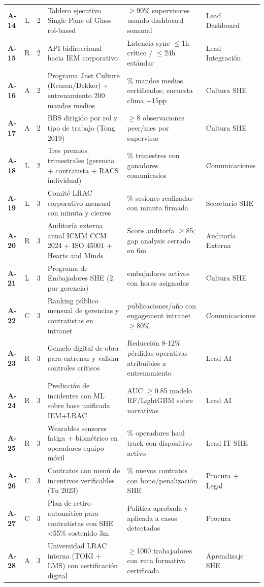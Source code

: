 \begin{longtable}{@{}>{\bfseries}p{0.55cm} c c >{\raggedright\arraybackslash}p{5.6cm} >{\raggedright\arraybackslash}p{4.8cm} >{\raggedright\arraybackslash}p{2.6cm}@{}}
A-14 & L & 2 & Tablero ejecutivo Single Pane of Glass rol-based & $\geq$90\% supervisores usando dashboard semanal & Lead Dashboard \\
A-15 & R & 2 & API bidireccional hacia IEM corporativo & Latencia sync $\leq$1h crítico / $\leq$24h estándar & Lead Integración \\
A-16 & A & 2 & Programa Just Culture (Reason/Dekker) + entrenamiento 200 mandos medios & 100\% mandos medios certificados; encuesta clima +15pp & Cultura SHE \\
A-17 & A & 2 & BBS dirigido por rol y tipo de trabajo (Tong 2019) & $\geq$8 observaciones peer/mes por supervisor & Cultura SHE \\
A-18 & L & 2 & Tres premios trimestrales (gerencia + contratista + RACS individual) & 100\% trimestres con ganadores comunicados & Comunicaciones \\
A-19 & L & 3 & Comité LRAC corporativo mensual con minuta y cierres & 100\% sesiones realizadas con minuta firmada & Secretario SHE \\
A-20 & R & 3 & Auditoría externa anual ICMM CCM 2024 + ISO 45001 + Hearts and Minds & Score auditoría $\geq$85; gap analysis cerrado en 6m & Auditoría Externa \\
A-21 & L & 3 & Programa de Embajadores SHE (2 por gerencia) & 24 embajadores activos con horas asignadas & Cultura SHE \\
A-22 & C & 3 & Ranking público mensual de gerencias y contratistas en intranet & 12 publicaciones/año con engagement intranet $\geq$80\% & Comunicaciones \\
A-23 & R & 3 & Gemelo digital de obra para entrenar y validar controles críticos & Reducción 8-12\% pérdidas operativas atribuibles a entrenamiento & Lead AI \\
A-24 & R & 3 & Predicción de incidentes con ML sobre base unificada IEM+LRAC & AUC $\geq$0.85 modelo RF/LightGBM sobre narrativas & Lead AI \\
A-25 & R & 3 & Wearables sensores fatiga + biométrico en operadores equipo móvil & 100\% operadores haul truck con dispositivo activo & Lead IT SHE \\
A-26 & C & 3 & Contratos con menú de incentivos verificables (Tu 2023) & 100\% nuevos contratos con bono/penalización SHE & Procura + Legal \\
A-27 & C & 3 & Plan de retiro automático para contratistas con SHE <55\% sostenido 3m & Política aprobada y aplicada a casos detectados & Procura \\
A-28 & A & 3 & Universidad LRAC interna (TOKI + LMS) con certificación digital & $\geq$1000 trabajadores con ruta formativa certificada & Aprendizaje SHE \\

\end{longtable}
